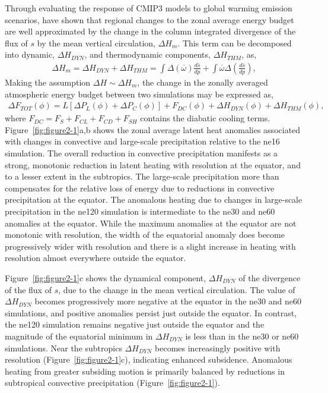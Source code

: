 Through evaluating the response of CMIP3 models to global warming emission scenarios, \cite{MO2011NATUREC} have shown that regional changes to the zonal average energy budget are well approximated by the change in the column integrated divergence of the flux of $s$ by the mean vertical circulation, $\Delta H_m$. This term can be decomposed into dynamic, $\Delta H_{DYN}$, and thermodynamic components, $\Delta H_{THM}$, as,
\begin{eqnarray}
\Delta H_m = \Delta H_{DYN} + \Delta H_{THM} = \int \Delta (\overline{\omega}) \frac{d \overline{s}}{dp} + \int \overline{\omega} \Delta (\frac{d \overline{s}}{dp}), \label{eq:eq2-4}
\end{eqnarray}
Making the assumption $\Delta H  \sim \Delta H_m$, the change in the zonally averaged atmospheric energy budget between two simulations may be expressed as,
\begin{eqnarray}
\Delta F_{TOT} (\phi)= L[\Delta P_L (\phi) + \Delta P_C (\phi)] + F_{DC} (\phi) + \Delta H_{DYN} (\phi) + \Delta H_{THM} (\phi), \label{eq:eq2-5}
\end{eqnarray}
where $F_{DC} = F_S + F_{CL} + F_{CD} + F_{SH}$ contains the diabatic cooling terms. Figure~\ref{fig:figure2-1}a,b shows the zonal average latent heat anomalies associated with changes in convective and large-scale precipitation relative to the ne16 simulation. The overall reduction in convective precipitation manifests as a strong, monotonic reduction in latent heating with resolution at the equator, and to a lesser extent in the subtropics. The large-scale precipitation more than compensates for the relative loss of energy due to reductions in convective precipitation at the equator. The anomalous heating due to changes in large-scale precipitation in the ne120 simulation is intermediate to the ne30 and ne60 anomalies at the equator. While the maximum anomalies at the equator are not monotonic with resolution, the width of the equatorial anomaly does become progressively wider with resolution and there is a slight increase in heating with resolution almost everywhere outside the equator.

Figure~\ref{fig:figure2-1}c shows the dynamical component, $\Delta H_{DYN}$ of the divergence of the flux of $s$, due to the change in the mean vertical circulation. The value of $\Delta H_{DYN}$ becomes progressively more negative at the equator in the ne30 and ne60 simulations, and positive anomalies persist just outside the equator. In contrast, the ne120 simulation remains negative just outside the equator and the magnitude of the equatorial minimum in $\Delta H_{DYN}$ is less than in the ne30 or ne60 simulations. Near the subtropics $\Delta H_{DYN}$ becomes increasingly positive with resolution (Figure~\ref{fig:figure2-1}c), indicating enhanced subsidence. Anomalous heating from greater subsiding motion is primarily balanced by reductions in subtropical convective precipitation (Figure~\ref{fig:figure2-1}).

